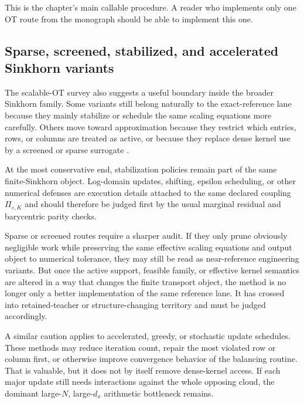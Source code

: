 This is the chapter’s main callable procedure.  A reader who implements only one
OT route from the monograph should be able to implement this one.

\subsection{Sparse, screened, stabilized, and accelerated Sinkhorn variants}
\label{sec:bf-eot-solver-variant-boundary}

The scalable-OT survey also suggests a useful boundary inside the broader
Sinkhorn family.  Some variants still belong naturally to the exact-reference
lane because they mainly stabilize or schedule the same scaling equations more
carefully.  Others move toward approximation because they restrict which entries,
rows, or columns are treated as active, or because they replace dense kernel use
by a screened or sparse surrogate \citep{schmitzer2016sparse,alaya2019screenkhorn,schmitzer2019stabilized,altschuler2017nearlinear,dvurechensky2018computational,abid2018greedy,lin2019efficient,xu2026accelerating,genevay2016stochastic}.

At the most conservative end, stabilization policies remain part of the same
finite-Sinkhorn object.  Log-domain updates, shifting, epsilon scheduling, or
other numerical defenses are execution details attached to the same declared
coupling \(\Pi_{\varepsilon,K}\) and should therefore be judged first by the
usual marginal residual and barycentric parity checks.

Sparse or screened routes require a sharper audit.  If they only prune obviously
negligible work while preserving the same effective scaling equations and output
object to numerical tolerance, they may still be read as near-reference
engineering variants.  But once the active support, feasible family, or effective
kernel semantics are altered in a way that changes the finite transport object,
the method is no longer only a better implementation of the same reference lane.
It has crossed into retained-teacher or structure-changing territory and must be
judged accordingly.

A similar caution applies to accelerated, greedy, or stochastic update schedules.
These methods may reduce iteration count, repair the most violated row or column
first, or otherwise improve convergence behavior of the balancing routine.  That
is valuable, but it does not by itself remove dense-kernel access.  If each major
update still needs interactions against the whole opposing cloud, the dominant
large-\(N\), large-\(d_x\) arithmetic bottleneck remains.

